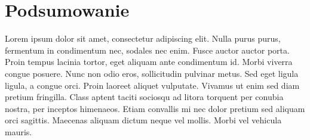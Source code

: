 \chapter{Podsumowanie}

Lorem ipsum dolor sit amet, consectetur adipiscing elit. Nulla purus purus, fermentum in condimentum nec, sodales nec enim. Fusce auctor auctor porta. Proin tempus lacinia tortor, eget aliquam ante condimentum id. Morbi viverra congue posuere. Nunc non odio eros, sollicitudin pulvinar metus. Sed eget ligula ligula, a congue orci. Proin laoreet aliquet vulputate. Vivamus ut enim sed diam pretium fringilla. Class aptent taciti sociosqu ad litora torquent per conubia nostra, per inceptos himenaeos. Etiam convallis mi nec dolor pretium sed aliquam orci sagittis. Maecenas aliquam dictum neque vel mollis. Morbi vel vehicula mauris.
